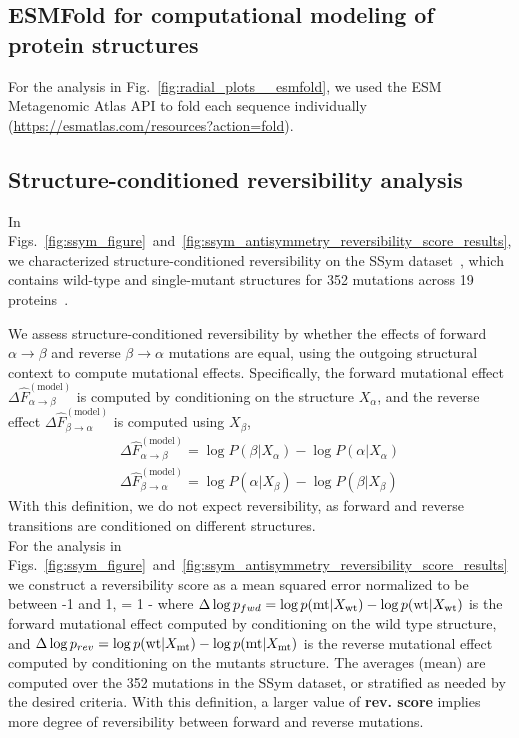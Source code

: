 \subsection{ESMFold for computational modeling of protein structures}
For the analysis in Fig.~\ref{fig:radial_plots__esmfold}, we used the ESM Metagenomic Atlas API to
fold each sequence individually (\url{https://esmatlas.com/resources?action=fold}).


\subsection{Structure-conditioned reversibility analysis}

In Figs.~\ref{fig:ssym_figure}~and~\ref{fig:ssym_antisymmetry_reversibility_score_results}, we
characterized structure-conditioned reversibility on the SSym
dataset~\cite{pucci_quantification_2018}, which contains wild-type and single-mutant structures for
352 mutations across 19 proteins~\citep{pancotti_predicting_2022}.

We assess structure-conditioned reversibility by whether the effects of forward $\alpha\to \beta$
and reverse $\beta\to \alpha$ mutations are equal, using the outgoing structural context to compute
mutational effects. Specifically, the forward mutational effect $\Delta \hat
F^{(\text{model})}_{\alpha\to \beta}$ is computed by conditioning on the structure $X_\alpha$, and
the reverse effect $\Delta \hat F^{(\text{model})}_{\beta\to \alpha}$ is computed using $X_\beta$,
\begin{equation}
\begin{aligned}
    \Delta \hat F^{(\text{model})}_{\alpha\to \beta} = \log P(\beta | X_{\alpha}) - \log P(\alpha
    |X_{\alpha}) \\
    \Delta \hat F^{(\text{model})}_{\beta\to \alpha} = \log P(\alpha | X_{\beta}) - \log P(\beta
    |X_{\beta})
\end{aligned}
\end{equation}
With this definition, we do not expect reversibility, as forward and reverse transitions are
conditioned on different structures.\\


 For the analysis in
Figs.~\ref{fig:ssym_figure}~and~\ref{fig:ssym_antisymmetry_reversibility_score_results} we construct
a reversibility score as a mean squared error normalized to be between -1 and 1,
\EQ
{} = 1 - 
\label{eq:rev_score}
\EE
where $\Delta \log p_{fwd} = \log p({\text{mt}} | X_{\text{wt}}) - \log p({\text{wt}} | X_{\text{wt}})$ is the forward mutational
effect computed by conditioning on the wild type structure, and $\Delta \log p_{rev} = \log p({\text{wt}} |
X_{\text{mt}}) - \log p({\text{mt}} | X_{\text{mt}})$ is the reverse mutational effect computed by conditioning on the
mutants structure. The averages (mean) are computed over the 352 mutations in the SSym dataset, or
stratified as needed by the desired criteria.
With this definition, a larger value of {\bf rev. score} implies more degree of reversibility
between forward and reverse mutations. \\



